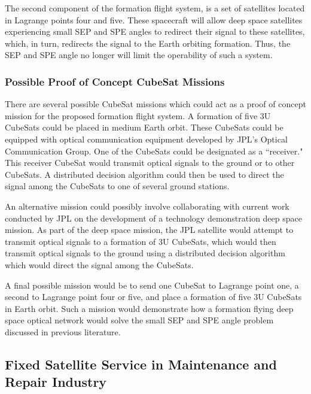 The second component of the formation flight system, is a set of satellites located in Lagrange points four and five. These spacecraft will allow deep space satellites experiencing small SEP and SPE angles to redirect their signal to these satellites, which, in turn, redirects the signal to the Earth orbiting formation. Thus, the SEP and SPE angle no longer will limit the operability of such a system.

\subsubsection{Possible Proof of Concept CubeSat Missions}
There are several possible CubeSat missions which could act as a proof of concept mission for the proposed formation flight system. A formation of five 3U CubeSats could be placed in medium Earth orbit. These CubeSats could be equipped with optical communication equipment developed by JPL's Optical Communication Group. One of the CubeSats could be designated as a ``receiver." This receiver CubeSat would transmit optical signals to the ground or to other CubeSats. A distributed decision algorithm could then be used to direct the signal among the CubeSats to one of several ground stations.

An alternative mission could possibly involve collaborating with current work conducted by JPL on the development of a technology demonstration deep space mission. As part of the deep space mission, the JPL satellite would attempt to transmit optical signals to a formation of 3U CubeSats, which would then transmit optical signals to the ground using a distributed decision algorithm which would direct the signal among the CubeSats. 

A final possible mission would be to send one CubeSat to Lagrange point one, a second to Lagrange point four or five, and place a formation of five 3U CubeSats in Earth orbit. Such a mission would demonstrate how a formation flying deep space optical network would solve the small SEP and SPE angle problem discussed in previous literature.




\subsection{Fixed Satellite Service in Maintenance and Repair Industry}
\label{mro}
